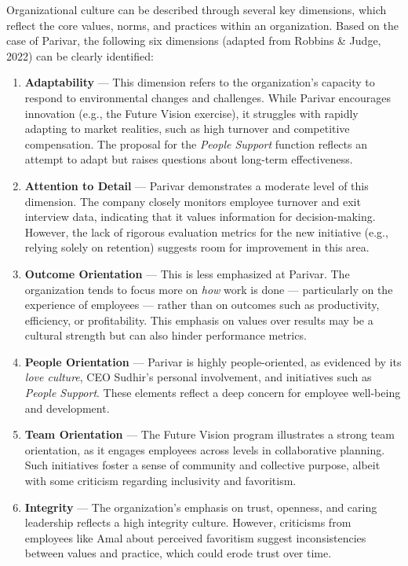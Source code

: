 \documentclass[10pt,a4paper]{book}
\begin{document}
Organizational culture can be described through several key dimensions, which reflect the core values, norms, and practices within an organization. Based on the case of Parivar, the following six dimensions (adapted from Robbins \& Judge, 2022) can be clearly identified:

\begin{enumerate}
    \item \textbf{Adaptability} --- This dimension refers to the organization's capacity to respond to environmental changes and challenges. While Parivar encourages innovation (e.g., the Future Vision exercise), it struggles with rapidly adapting to market realities, such as high turnover and competitive compensation. The proposal for the \textit{People Support} function reflects an attempt to adapt but raises questions about long-term effectiveness.

    \item \textbf{Attention to Detail} --- Parivar demonstrates a moderate level of this dimension. The company closely monitors employee turnover and exit interview data, indicating that it values information for decision-making. However, the lack of rigorous evaluation metrics for the new initiative (e.g., relying solely on retention) suggests room for improvement in this area.

    \item \textbf{Outcome Orientation} --- This is less emphasized at Parivar. The organization tends to focus more on \textit{how} work is done — particularly on the experience of employees — rather than on outcomes such as productivity, efficiency, or profitability. This emphasis on values over results may be a cultural strength but can also hinder performance metrics.

    \item \textbf{People Orientation} --- Parivar is highly people-oriented, as evidenced by its \textit{love culture}, CEO Sudhir's personal involvement, and initiatives such as \textit{People Support}. These elements reflect a deep concern for employee well-being and development.

    \item \textbf{Team Orientation} --- The Future Vision program illustrates a strong team orientation, as it engages employees across levels in collaborative planning. Such initiatives foster a sense of community and collective purpose, albeit with some criticism regarding inclusivity and favoritism.

    \item \textbf{Integrity} --- The organization's emphasis on trust, openness, and caring leadership reflects a high integrity culture. However, criticisms from employees like Amal about perceived favoritism suggest inconsistencies between values and practice, which could erode trust over time.
\end{enumerate}
\end{document}

